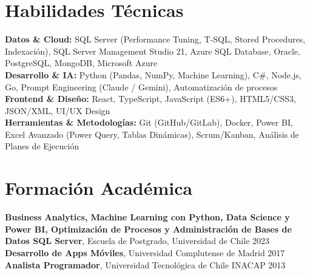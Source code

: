 \documentclass[11pt,letterpaper]{article}
\begin{document}
\section{Habilidades T\'{e}cnicas}
\textbf{Datos \& Cloud:} SQL Server (Performance Tuning, T-SQL, Stored Procedures, Indexación), SQL Server Management Studio 21, Azure SQL Database, Oracle, PostgreSQL, MongoDB, Microsoft Azure \\
\textbf{Desarrollo \& IA:} Python (Pandas, NumPy, Machine Learning), C\#, Node.js, Go, Prompt Engineering (Claude / Gemini), Automatización de procesos \\
\textbf{Frontend \& Diseño:} React, TypeScript, JavaScript (ES6+), HTML5/CSS3, JSON/XML, UI/UX Design \\
\textbf{Herramientas \& Metodologías:} Git (GitHub/GitLab), Docker, Power BI, Excel Avanzado (Power Query, Tablas Dinámicas), Scrum/Kanban, Análisis de Planes de Ejecución

\section{Formaci\'{o}n Acad\'{e}mica}
\textbf{Business Analytics, Machine Learning con Python, Data Science y Power BI, Optimización de Procesos y Administración de Bases de Datos SQL Server}, Escuela de Postgrado, Universidad de Chile \hfill 2023 \\
\textbf{Desarrollo de Apps Móviles}, Universidad Complutense de Madrid \hfill 2017 \\
\textbf{Analista Programador}, Universidad Tecnológica de Chile INACAP \hfill 2013
\end{document}
